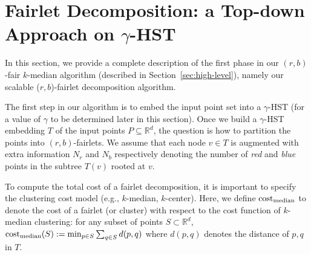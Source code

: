 \section{Fairlet Decomposition: a Top-down Approach on $\gamma$-HST}\label{sec:log-approx}

In this section, we provide a complete description of the first phase in our $(r,b)$-fair $k$-median algorithm (described in Section~\ref{sec:high-level}), namely our scalable ($r,b$)-fairlet decomposition algorithm. 

The first step in our algorithm is to embed the input point set into a $\gamma$-HST (for a value of $\gamma$ to be determined later in this section).
Once we build a $\gamma$-HST embedding $T$ of the input points $P\subseteq \mathbb{R}^d$, the question is how to partition the points into $(r,b)$-fairlets. 
We assume that each node $v\in T$ is augmented with extra information $N_r$ and $N_b$ respectively denoting the number of {\em red} and {\em blue} points in the subtree $T(v)$ rooted at $v$. 

To compute the total cost of a fairlet decomposition, it is important to specify the clustering cost model (e.g., $k$-median, $k$-center). Here, we define $\mathrm{cost}_{\mathrm{median}}$ to denote the cost of a fairlet (or cluster) with respect to the cost function of $k$-median clustering: for any subset of points $S\subset \mathbb{R}^d$, 
$\mathrm{cost}_{\mathrm{median}}(S) := \min_{p\in S}\sum_{q\in S} d(p,q)$ where $d(p,q)$ denotes the distance of $p,q$ in $T$.

